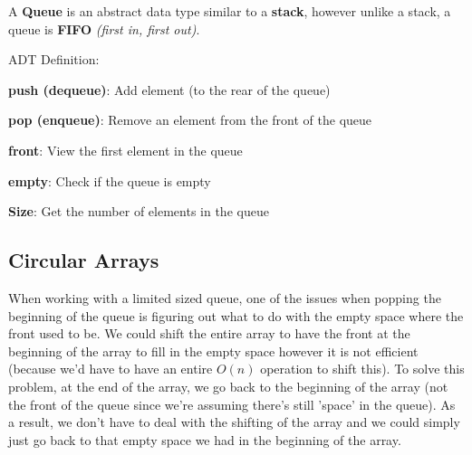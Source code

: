 \documentclass[11pt,a4paper,english]{paper}
\begin{document}
A \textbf{Queue} is an abstract data type similar to a \textbf{stack}, however unlike a stack, a queue is \textbf{FIFO} \textit{(first in, first out)}.

\bigskip
\begin{bluebox}{ADT Definition:} {

    \textbf{push (dequeue)}: Add element (to the rear of the queue)

    \textbf{pop (enqueue)}: Remove an element from the front of the queue

    \textbf{front}: View the first element in the queue

    \textbf{empty}: Check if the queue is empty

    \textbf{Size}: Get the number of elements in the queue


}\end{bluebox}

\subsection{Circular Arrays}

When working with a limited sized queue, one of the issues when popping the beginning of the queue is figuring out what to do with the empty space where the front used to be. We could shift the entire array to have the front at the beginning of the array to fill in the empty space however it is not efficient (because we'd have to have an entire $O(n)$ operation to shift this). To solve this problem, at the end of the array, we go back to the beginning of the array (not the front of the queue since we're assuming there's still 'space' in the queue). As a result, we don't have to deal with the shifting of the array and we could simply just go back to that empty space we had in the beginning of the array.
\end{document}
